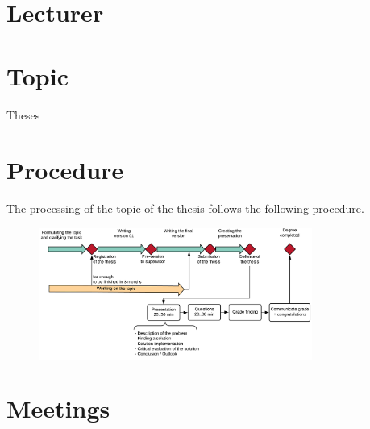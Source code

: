 \documentclass[]{cv-style} %
\begin{document}
\lastupdated


\begin{aside}
\section{Lecturer}
%
\color{black}{Prof. A. Wenzel}
%
%
%
\section{Topic}
Theses
%
%
\end{aside}

\section{Procedure}

The processing of the topic of the thesis follows the following procedure.

            \begin{figure}[h]
              \colorbox{white}{\includegraphics[width=0.8\textwidth]{procedure of the thesis.png}}
            \end{figure}


\bigskip

\section{Meetings}
\end{document}

